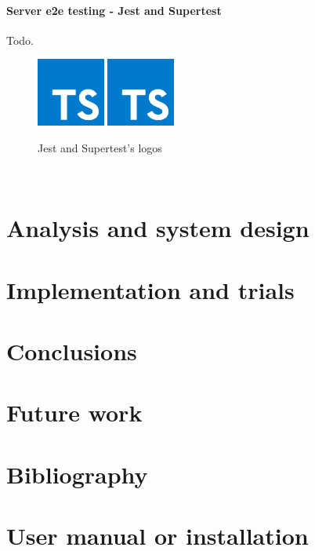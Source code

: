 \documentclass[a4paper, 12pt, oneside]{book}
\begin{document}
\subsubsection{Server e2e testing - Jest and Supertest}
Todo.
\\
\begin{figure}[h!]
	\centering
	\includegraphics[width=0.2\textwidth]{assets/ts-logo.png}
	\includegraphics[width=0.2\textwidth]{assets/ts-logo.png}
	\caption{Jest and Supertest's logos}
\end{figure}
\\
\chapter{Analysis and system design}
\chapter{Implementation and trials}
\chapter{Conclusions}
\chapter{Future work}
\appendix
\chapter{Bibliography}
\chapter{User manual or installation}
\end{document}
